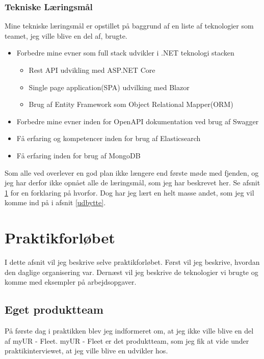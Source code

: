 \documentclass[a4paper]{article}
\begin{document}
\subsubsection*{Tekniske Læringsmål}
Mine tekniske læringsmål er opstillet på baggrund af en liste af teknologier
som teamet, jeg ville blive en del af, brugte.

\begin{itemize}
    \item Forbedre mine evner som full stack udvikler i .NET teknologi stacken
    \begin{itemize}
        \item Rest API udvikling med ASP.NET Core
        \item Single page application(SPA) udvilking med Blazor
        \item Brug af Entity Framework som Object Relational Mapper(ORM)
    \end{itemize}
    \item Forbedre mine evner inden for OpenAPI dokumentation ved brug af
    Swagger
    \item Få erfaring og kompetencer inden for brug af Elasticsearch
    \item Få erfaring inden for brug af MongoDB
\end{itemize}

Som alle ved overlever en god plan ikke længere end første møde med fjenden,
og jeg har derfor ikke opnået alle de læringsmål, som jeg har beskrevet her.
Se afsnit \ref{praktikforloeb} for en forklaring på hvorfor.
Dog har jeg lært en helt masse andet, 
som jeg vil komme ind på i afsnit \ref{udbytte}.

\newpage
\section{Praktikforløbet}
\label{praktikforloeb}
I dette afsnit vil jeg beskrive selve praktikforløbet.
Først vil jeg beskrive, hvordan den daglige organisering var.
Dernæst vil jeg beskrive de teknologier vi brugte og komme med eksempler på arbejdsopgaver.

\subsection{Eget produktteam}
\label{produktteam}
På første dag i praktikken blev jeg indformeret om,
at jeg ikke ville blive en del af myUR - Fleet.
myUR - Fleet er det produktteam, som jeg fik at vide under praktikinterviewet,
at jeg ville blive en udvikler hos.
\end{document}
